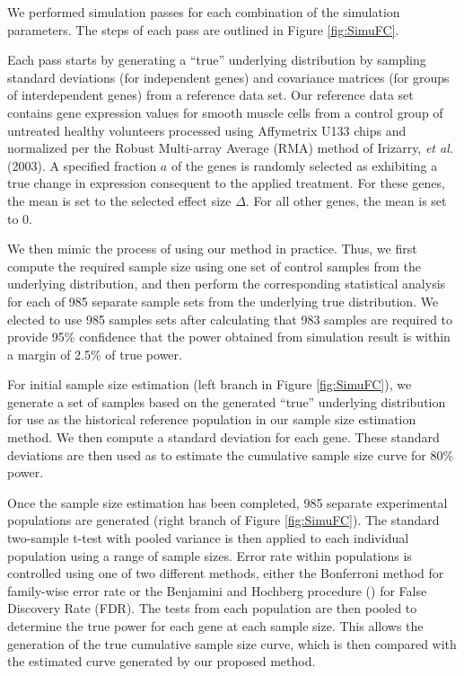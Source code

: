 \documentclass{bioinfo}
\begin{document}
We performed simulation passes for each combination of the
simulation parameters.  The steps of each pass are outlined in
Figure \ref{fig:SimuFC}.

Each pass starts by generating a ``true'' underlying distribution
by sampling standard deviations (for independent genes) and
covariance matrices (for groups of interdependent genes) from a
reference data set.  Our reference data set contains gene
expression values for smooth muscle cells from a control group of
untreated healthy volunteers processed using Affymetrix U133 chips
and normalized per the Robust Multi-array Average (RMA) method of
Irizarry, \textit{et al.} (2003).  A specified fraction $a$ of the
genes is randomly selected as exhibiting a true change in
expression consequent to the applied treatment. For these genes,
the mean is set to the selected effect size $\Delta$.  For all
other genes, the mean is set to $0$.

We then mimic the process of using our method in practice. Thus, we
first compute the required sample size using one set of control
samples from the underlying distribution, and then perform the
corresponding statistical analysis for each of 985 separate sample
sets from the underlying true distribution.  We elected to use 985
samples sets after calculating that 983 samples are required to
provide 95\% confidence that the power obtained from simulation
result is within a margin of 2.5\% of true power.

For initial sample size estimation (left branch in Figure
\ref{fig:SimuFC}), we generate a set of samples based on the
generated ``true'' underlying distribution for use as the historical
reference population in our sample size estimation method.  We then
compute a standard deviation for each gene. These standard
deviations are then used as to estimate the cumulative sample size
curve for 80\% power.

Once the sample size estimation has been completed, 985 separate
experimental populations are generated (right branch of Figure
\ref{fig:SimuFC}).  The standard two-sample t-test with pooled
variance is then applied to each individual population using a range
of sample sizes.  Error rate within populations is controlled using
one of two different methods, either the Bonferroni method for
family-wise error rate or the Benjamini and Hochberg procedure
(\citealp{Benjamini95}) for False Discovery Rate (FDR).  The tests
from each population are then pooled to determine the true power for
each gene at each sample size. This allows the generation of the
true cumulative sample size curve, which is then compared with the
estimated curve generated by our proposed method.
\end{document}
